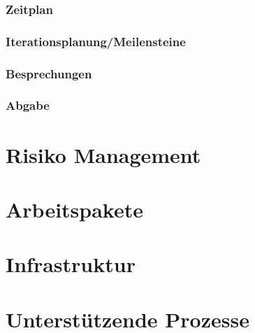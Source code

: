 \documentclass[12pt,a4paper,onecolumn]{article}
\begin{document}
\subsubsection{Zeitplan}
\subsubsection{Iterationsplanung/Meilensteine}
\subsubsection{Besprechungen}
\subsubsection{Abgabe}

\section{Risiko Management}
\section{Arbeitspakete}
\section{Infrastruktur}
\section{Unterstützende Prozesse}
\end{document}
